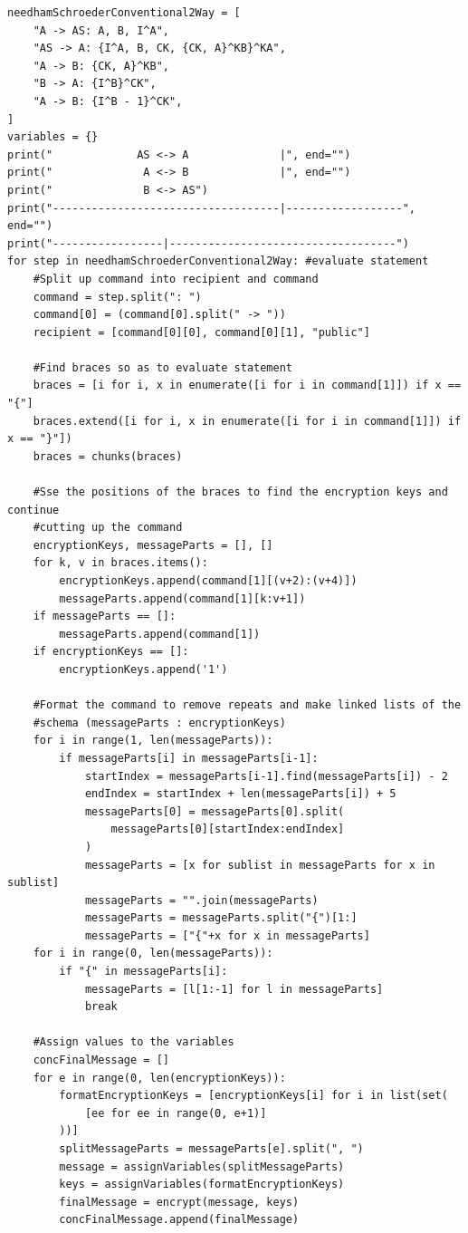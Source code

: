 \documentclass{article}
\begin{document}
\begin{verbatim}
needhamSchroederConventional2Way = [
    "A -> AS: A, B, I^A",
    "AS -> A: {I^A, B, CK, {CK, A}^KB}^KA",
    "A -> B: {CK, A}^KB",
    "B -> A: {I^B}^CK",
    "A -> B: {I^B - 1}^CK",
]
variables = {}
print("             AS <-> A              |", end="")
print("              A <-> B              |", end="")
print("              B <-> AS")
print("-----------------------------------|------------------", end="")
print("-----------------|-----------------------------------")
for step in needhamSchroederConventional2Way: #evaluate statement
    #Split up command into recipient and command
    command = step.split(": ")
    command[0] = (command[0].split(" -> "))
    recipient = [command[0][0], command[0][1], "public"]
    
    #Find braces so as to evaluate statement
    braces = [i for i, x in enumerate([i for i in command[1]]) if x == "{"]
    braces.extend([i for i, x in enumerate([i for i in command[1]]) if x == "}"])
    braces = chunks(braces)
    
    #Sse the positions of the braces to find the encryption keys and continue
    #cutting up the command
    encryptionKeys, messageParts = [], []
    for k, v in braces.items():
        encryptionKeys.append(command[1][(v+2):(v+4)])  
        messageParts.append(command[1][k:v+1])
    if messageParts == []:
        messageParts.append(command[1])
    if encryptionKeys == []:
        encryptionKeys.append('1')
    
    #Format the command to remove repeats and make linked lists of the 
    #schema (messageParts : encryptionKeys)
    for i in range(1, len(messageParts)):
        if messageParts[i] in messageParts[i-1]:
            startIndex = messageParts[i-1].find(messageParts[i]) - 2
            endIndex = startIndex + len(messageParts[i]) + 5
            messageParts[0] = messageParts[0].split(
                messageParts[0][startIndex:endIndex]
            )
            messageParts = [x for sublist in messageParts for x in sublist]
            messageParts = "".join(messageParts)
            messageParts = messageParts.split("{")[1:]
            messageParts = ["{"+x for x in messageParts]    
    for i in range(0, len(messageParts)):
        if "{" in messageParts[i]:
            messageParts = [l[1:-1] for l in messageParts]
            break
    
    #Assign values to the variables
    concFinalMessage = []
    for e in range(0, len(encryptionKeys)):
        formatEncryptionKeys = [encryptionKeys[i] for i in list(set(
            [ee for ee in range(0, e+1)]
        ))]
        splitMessageParts = messageParts[e].split(", ")
        message = assignVariables(splitMessageParts)
        keys = assignVariables(formatEncryptionKeys)
        finalMessage = encrypt(message, keys)
        concFinalMessage.append(finalMessage)


\end{verbatim}
\end{document}

